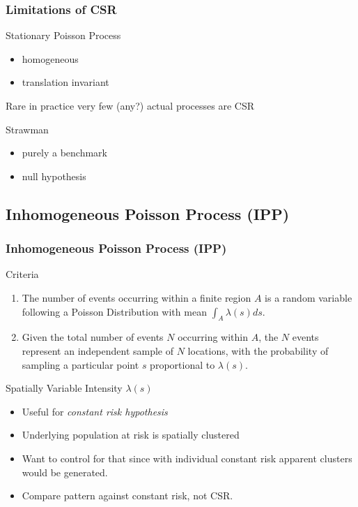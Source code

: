 \documentclass[nototal,handout]{beamer}
\begin{document}
  \begin{frame}
    \frametitle{Limitations of CSR}
    \begin{block}{Stationary Poisson Process}
      \begin{itemize}
	\item homogeneous
	\item translation invariant
      \end{itemize}
     \end{block}
     \begin{block}{Rare in practice}
       very few (any?) actual processes are CSR
      \end{block}
     \begin{block}{Strawman}
       \begin{itemize}
	 \item purely a benchmark
	 \item null hypothesis
       \end{itemize}
      \end{block}
   \end{frame}
   \subsection{Inhomogeneous Poisson Process (IPP)}
 \begin{frame}[<+->]
   \frametitle{Inhomogeneous Poisson Process (IPP)}
   \begin{block}{Criteria}
     \begin{enumerate}
       \item The number of events occurring within a finite  region $A$ is a
	 random variable following a Poisson Distribution with mean
	 $\int_{A}\lambda(s) ds$.
       \item Given the total number of events $N$ occurring within $A$, the
	 $N$ events represent an independent sample of $N$ locations, with the
	 probability of sampling a particular point $s$ proportional to
	 $\lambda(s)$.
     \end{enumerate}
    \end{block}
    \begin{block}{Spatially Variable Intensity $\lambda(s)$}
      \begin{itemize}
	\item Useful for \emph{constant risk hypothesis}
	\item Underlying population at risk is spatially clustered
	\item Want to control for that since with individual constant risk
	  apparent clusters would be generated.
	\item Compare pattern against constant risk, not CSR.
      \end{itemize}
    \end{block}
  \end{frame}
\end{document}
